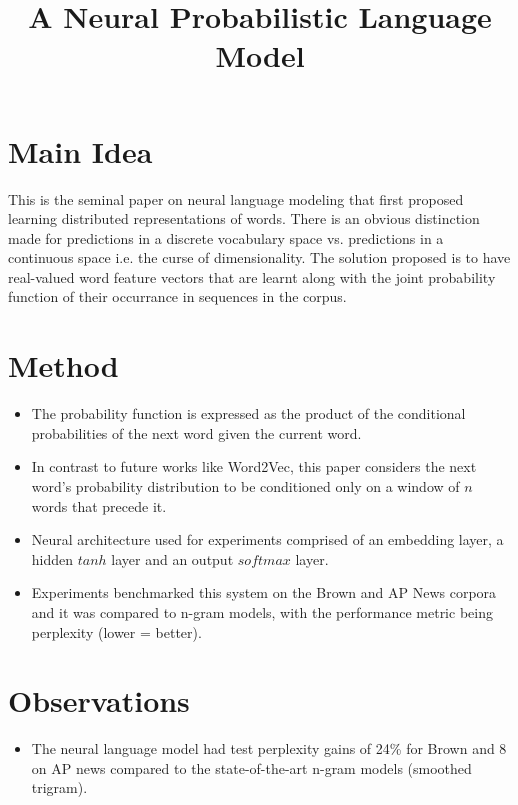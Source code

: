 \documentclass[12pt]{scrartcl}
\begin{document}
\title{A Neural Probabilistic Language Model}
\author{}
\date{}
\maketitle

\section{Main Idea}
  This is the seminal paper on neural language modeling that first proposed learning distributed representations of words. There is an obvious distinction made for predictions in a discrete vocabulary space vs. predictions in a continuous space i.e. the curse of dimensionality. The solution proposed is to have real-valued word feature vectors that are learnt along with the joint probability function of their occurrance in sequences in the corpus. \cite{bengio2003neural}

\section{Method}
  \begin{itemize}
    \item The probability function is expressed as the product of the conditional probabilities of the next word given the current word.
    \item In contrast to future works like Word2Vec, this paper considers the next word's probability distribution to be conditioned only on a window of $n$ words that precede it.
    \item Neural architecture used for experiments comprised of an embedding layer, a hidden $tanh$ layer and an output $softmax$ layer.
    \item Experiments benchmarked this system on the Brown and AP News corpora and it was compared to n-gram models, with the performance metric being perplexity (lower = better).
  \end{itemize}

\section{Observations}
  \begin{itemize}
    \item The neural language model had test perplexity gains of 24\% for Brown and 8\* on AP news compared to the state-of-the-art n-gram models (smoothed trigram).
  \end{itemize}



\end{document}
